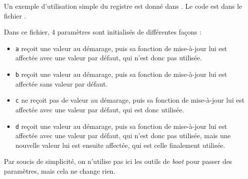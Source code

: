    Un exemple d'utilisation simple du registre est donné dans
. Le code est dans le fichier
.

   Dans ce fichier, 4 paramètres sont initialisés de différentes
façons :

\begin{itemize}
   \item{\tt a} reçoit une valeur au démarage, puis sa fonction de
     mise-à-jour lui est affectée avec une valeur par défaut, qui
     n'est donc pas utilisée.
   \item{\tt b} reçoit une valeur au démarage, puis sa fonction de
     mise-à-jour lui est affectée sans valeur par défaut.
   \item{\tt c} ne reçoit pas de valeur au démarage, puis sa fonction
     de mise-à-jour lui est affectée avec une valeur par défaut, qui
     est donc utilisée.
   \item{\tt d} reçoit une valeur au démarage, puis sa fonction de
     mise-à-jour lui est affectée avec une valeur par défaut, qui
     n'est donc pas utilisée, mais une nouvelle valeur lui est ensuite
     affectée, qui est celle finalement utilisée.     
\end{itemize}

   Par soucis de simplicité, on n'utilise pas ici les outils de {\em boot}
pour passer des paramètres, mais cela ne change rien.
